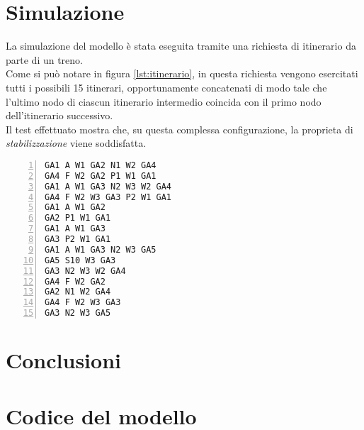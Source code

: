 \documentclass[10pt,a4paper,oneside]{report}
\begin{document}
\chapter{Simulazione}
La simulazione del modello è stata eseguita tramite una richiesta di itinerario da parte di un treno.\\ Come si può notare in figura \ref{lst:itinerario}, in questa richiesta vengono esercitati tutti i possibili 15 itinerari, opportunamente concatenati di modo tale che l'ultimo nodo di ciascun itinerario intermedio coincida con il primo nodo dell'itinerario successivo.\\
Il test effettuato mostra che, su questa complessa configurazione, la proprieta di \emph{stabilizzazione} viene soddisfatta.

\begin{lstlisting}[numbers=left,
numberstyle=\tiny,caption={Simulazione di itinerario effettuata},
label=lst:itinerario]
GA1 A W1 GA2 N1 W2 GA4
GA4 F W2 GA2 P1 W1 GA1
GA1 A W1 GA3 N2 W3 W2 GA4
GA4 F W2 W3 GA3 P2 W1 GA1
GA1 A W1 GA2
GA2 P1 W1 GA1
GA1 A W1 GA3
GA3 P2 W1 GA1
GA1 A W1 GA3 N2 W3 GA5
GA5 S10 W3 GA3
GA3 N2 W3 W2 GA4
GA4 F W2 GA2
GA2 N1 W2 GA4
GA4 F W2 W3 GA3
GA3 N2 W3 GA5
\end{lstlisting}

\chapter{Conclusioni}
\appendix


\chapter{Codice del modello}

\end{document}
